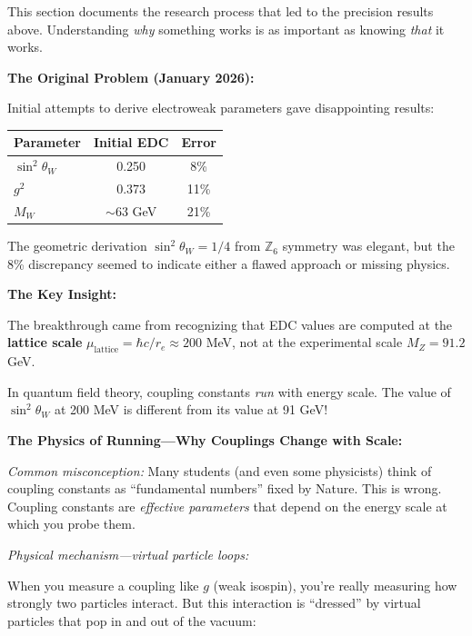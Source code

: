 \begin{tcolorbox}[colback=yellow!5, colframe=orange!60!black,
  title={Historical Note: How This Chapter Evolved}, breakable]

This section documents the research process that led to the precision results above.
Understanding \emph{why} something works is as important as knowing \emph{that} it works.

\textbf{The Original Problem (January 2026):}

Initial attempts to derive electroweak parameters gave disappointing results:
\begin{center}
\begin{tabular}{lcc}
\toprule
Parameter & Initial EDC & Error \\
\midrule
$\sin^2\theta_W$ & 0.250 & 8\% \\
$g^2$ & 0.373 & 11\% \\
$M_W$ & $\sim 63$ GeV & 21\% \\
\bottomrule
\end{tabular}
\end{center}

The geometric derivation $\sin^2\theta_W = 1/4$ from $\mathbb{Z}_6$ symmetry was elegant,
but the 8\% discrepancy seemed to indicate either a flawed approach or missing physics.

\textbf{The Key Insight:}

The breakthrough came from recognizing that EDC values are computed at the
\textbf{lattice scale} $\mu_{\text{lattice}} = \hbar c / r_e \approx 200$ MeV,
not at the experimental scale $M_Z = 91.2$ GeV.

In quantum field theory, coupling constants \emph{run} with energy scale.
The value of $\sin^2\theta_W$ at 200 MeV is different from its value at 91 GeV!

\textbf{The Physics of Running---Why Couplings Change with Scale:}

\emph{Common misconception:} Many students (and even some physicists) think of coupling
constants as ``fundamental numbers'' fixed by Nature. This is wrong. Coupling constants
are \emph{effective parameters} that depend on the energy scale at which you probe them.

\emph{Physical mechanism---virtual particle loops:}

When you measure a coupling like $g$ (weak isospin), you're really measuring how strongly
two particles interact. But this interaction is ``dressed'' by virtual particles that
pop in and out of the vacuum:


\end{tcolorbox}
